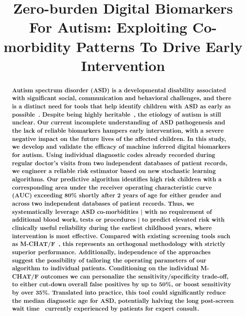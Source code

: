 \documentclass[onecolumn,,10pt]{IEEEtran}
\title{ \sffamily \fontsize{20}{24}\selectfont  Zero-burden Digital Biomarkers For Autism:  Exploiting  Co-morbidity Patterns
To Drive Early Intervention
}
\author{\sffamily  \fontsize{10}{12}\selectfont  Dmytro Onishchenko$^{1}$, Yi Huang$^{1}$,  James van Horne$^{5}$, Peter J. Smith$^{4}$ and Ishanu Chattopadhyay$^{1,2,3\bigstar}$\\ 
\vspace{10pt}

\sffamily  \fontsize{10}{12}\selectfont
$^{1}$Institute of Genomics and Systems Biology and\\ Department of Medicine,\\
$^{2}$Committee on Genetics, Genomics \& Systems Biology, University of Chicago,\\
$^{3}$Committee on Quantitative Methods in Social, Behavioral, and Health Sciences, University of Chicago, \\
$^{4}$Department of Pediatrics,
 University of Chicago, \\
$^{5}$Booth School of Business, University of Chicago, Chicago, IL, 60637, USA,\\
\vskip 1em
$^\bigstar$To whom correspondence should be addressed: e-mail:  \texttt{ishanu@uchicago.edu}.}
\begin{document}
\maketitle

\vspace{-15pt}

\begin{abstract} \bf \sffamily \fontsize{10}{12}\selectfont \noindent
 Autism spectrum disorder (ASD) is a developmental disability associated with  significant social, communication and behavioral challenges, and there is a distinct need for tools that help identify children with ASD as early as possible~\cite{cdc0,nimh}.
  Despite being  highly heritable~\cite{sandin17}, the etiology of autism is still unclear. 
Our current incomplete understanding of ASD pathogenesis and the lack of reliable biomarkers hampers early intervention, with a severe negative impact on the future lives of the affected children. In this study, we develop and validate the efficacy of machine inferred \textbf{digital biomarkers} for autism. Using individual diagnostic codes already recorded during regular doctor's visits from two independent databases of patient records, we engineer a reliable risk estimator based on new stochastic learning algorithms. Our predictive algorithm identifies high risk children  with a corresponding area under the receiver operating characteristic curve (AUC)  exceeding 80\% shortly after 2 years of age for either gender and across two independent databases of patient records. Thus, we systematically leverage ASD co-morbidities | with no requirement of additional blood work, tests  or  procedures |  to predict  elevated  risk with clinically useful reliability during the earliest childhood years, where intervention is  most effective.  Compared with existing screening tools such as M-CHAT/F~\cite{pmid31562252}, this represents an orthogonal  methodology with strictly superior performance. Additionally, independence of the approaches suggest the possibility of  tailoring  the operating parameters of our algorithm to individual patients. Conditioning on the individual M-CHAT/F outcomes we can personalize the sensitivity/specificity trade-off,  to either cut-down overall false positives by up to 50\%, or boost sensitivity by over 35\%.  Translated into practice, this tool could significantly reduce the median diagnostic age for ASD, potentially halving the  long post-screen wait time~\cite{pmid27565363} currently experienced by patients  for expert consult.
  \end{abstract}
\end{document}
